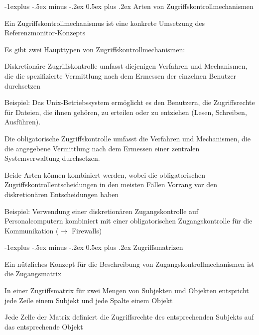 \documentclass[a4paper]{article}
\makeatletter
\renewcommand{\subsection}{\@startsection{subsection}{2}{0mm}%
 {-1explus -.5ex minus -.2ex}%
 {0.5ex plus .2ex}%
 {\normalfont\normalsize\bfseries}}
\makeatother
\begin{document}
\begin{multicols}{3}
      \subsection{Arten von Zugriffskontrollmechanismen}
      \begin{itemize*}
            \item Ein Zugriffskontrollmechanismus ist eine konkrete Umsetzung des Referenzmonitor-Konzepts
            \item Es gibt zwei Haupttypen von Zugriffskontrollmechanismen:
            \begin{itemize*}
                  \item Diskretionäre Zugriffskontrolle umfasst diejenigen Verfahren und Mechanismen, die die spezifizierte Vermittlung nach dem Ermessen der einzelnen Benutzer durchsetzen
                  \item Beispiel: Das Unix-Betriebssystem ermöglicht es den Benutzern, die Zugriffsrechte für Dateien, die ihnen gehören, zu erteilen oder zu entziehen (Lesen, Schreiben, Ausführen).
                  \item Die obligatorische Zugriffskontrolle umfasst die Verfahren und Mechanismen, die die angegebene Vermittlung nach dem Ermessen einer zentralen Systemverwaltung durchsetzen.
            \end{itemize*}
            \item Beide Arten können kombiniert werden, wobei die obligatorischen Zugriffskontrollentscheidungen in den meisten Fällen Vorrang vor den diskretionären Entscheidungen haben
            \item Beispiel: Verwendung einer diskretionären Zugangskontrolle auf Personalcomputern kombiniert mit einer obligatorischen Zugangskontrolle für die Kommunikation ($\rightarrow$ Firewalls)
      \end{itemize*}

      \subsection{Zugriffsmatrizen}
      \begin{itemize*}
            \item Ein nützliches Konzept für die Beschreibung von Zugangskontrollmechanismen ist die Zugangsmatrix
            \item In einer Zugriffsmatrix für zwei Mengen von Subjekten und Objekten entspricht jede Zeile einem Subjekt und jede Spalte einem Objekt
            \item Jede Zelle der Matrix definiert die Zugriffsrechte des entsprechenden Subjekts auf das entsprechende Objekt
      \end{itemize*}


\end{multicols}
\end{document}
